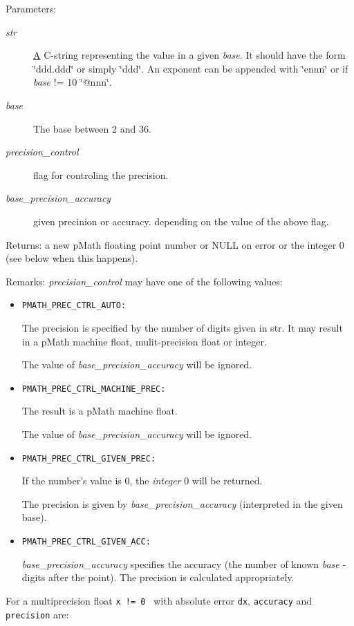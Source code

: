 \begin{Desc}
\item[Parameters:]
\begin{description}
\item[{\em str}]\hyperlink{class_a}{A} C-string representing the value in a given {\em base\/}. It should have the form \char`\"{}ddd.ddd\char`\"{} or simply \char`\"{}ddd\char`\"{}. An exponent can be appended with \char`\"{}ennn\char`\"{} or if {\em base\/} != 10 \char`\"{}@nnn\char`\"{}. \item[{\em base}]The base between 2 and 36. \item[{\em precision\_\-control}]flag for controling the precision. \item[{\em base\_\-precision\_\-accuracy}]given precinion or accuracy. depending on the value of the above flag. \end{description}
\end{Desc}
\begin{Desc}
\item[Returns:]a new pMath floating point number or NULL on error or the integer 0 (see below when this happens).\end{Desc}
\begin{Desc}
\item[Remarks:]{\em precision\_\-control\/} may have one of the following values: \begin{itemize}
\item {\tt PMATH\_\-PREC\_\-CTRL\_\-AUTO:} \par
 The precision is specified by the number of digits given in str. It may result in a pMath machine float, mulit-precision float or integer. \par
 The value of {\em base\_\-precision\_\-accuracy\/} will be ignored.

\item {\tt PMATH\_\-PREC\_\-CTRL\_\-MACHINE\_\-PREC:} \par
 The result is a pMath machine float. \par
 The value of {\em base\_\-precision\_\-accuracy\/} will be ignored.

\item {\tt PMATH\_\-PREC\_\-CTRL\_\-GIVEN\_\-PREC:} \par
 If the number's value is 0, the {\em integer\/} 0 will be returned. \par
 The precision is given by {\em base\_\-precision\_\-accuracy\/} (interpreted in the given base).

\item {\tt PMATH\_\-PREC\_\-CTRL\_\-GIVEN\_\-ACC:} \par
 {\em base\_\-precision\_\-accuracy\/} specifies the accuracy (the number of known {\em base\/} -digits after the point). The precision is calculated appropriately. \end{itemize}
\end{Desc}
For a multiprecision float {\tt  x != 0 } with absolute error {\tt dx}, {\tt accuracy} and {\tt precision} are:



